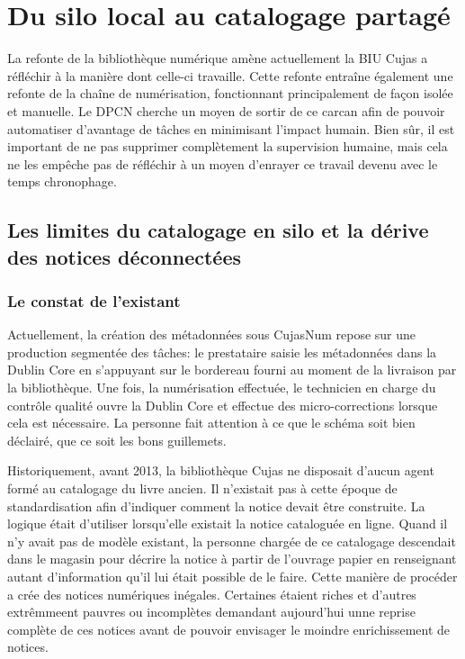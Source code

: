 \section{Du silo local au catalogage partagé}
La refonte de la bibliothèque numérique amène actuellement la BIU Cujas a réfléchir à la manière dont celle-ci travaille. Cette refonte entraîne également une refonte de la chaîne de numérisation, fonctionnant principalement de façon isolée et manuelle. Le DPCN cherche un moyen de sortir de ce carcan afin de pouvoir automatiser d'avantage de tâches en minimisant l'impact humain. Bien sûr, il est important de ne pas supprimer complètement la supervision humaine, mais cela ne les empêche pas de réfléchir à un moyen d'enrayer ce travail devenu avec le temps chronophage.

\subsection{Les limites du catalogage en silo et la dérive des notices déconnectées}
\subsubsection*{Le constat de l'existant}
Actuellement, la création des métadonnées sous CujasNum repose sur une production segmentée des tâches: le prestataire saisie les métadonnées dans la Dublin Core en s'appuyant sur le bordereau fourni au moment de la livraison par la bibliothèque. Une fois, la numérisation effectuée, le technicien en charge du contrôle qualité ouvre la Dublin Core et effectue des micro-corrections lorsque cela est nécessaire. La personne fait attention à ce que le schéma soit bien déclairé, que ce soit les bons guillemets. 

Historiquement, avant 2013, la bibliothèque Cujas ne disposait d'aucun agent formé au catalogage du livre ancien. Il n'existait pas à cette époque de standardisation afin d'indiquer comment la notice devait être construite. La logique était d'utiliser lorsqu'elle existait la notice cataloguée en ligne. Quand il n'y avait pas de modèle existant, la personne chargée de ce catalogage descendait dans le magasin pour décrire la notice à partir de l'ouvrage papier en renseignant autant d'information qu'il lui était possible de le faire. Cette manière de procéder a crée des notices numériques inégales. Certaines étaient riches et d'autres extrêmmeent pauvres ou incomplètes demandant aujourd'hui unne reprise complète de ces notices avant de pouvoir envisager le moindre enrichissement de notices.

